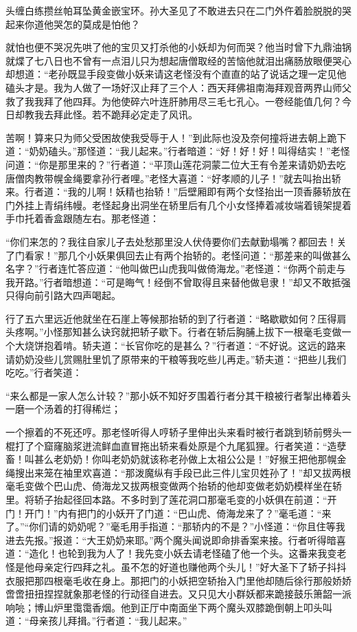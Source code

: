 \documentclass[12pt,UTF8]{ctexbook}
\begin{document}
头缠白练攒丝帕耳坠黄金嵌宝环。孙大圣见了不敢进去只在二门外仵着脸脱脱的哭起来你道他哭怎的莫成是怕他？

就怕也便不哭况先哄了他的宝贝又打杀他的小妖却为何而哭？他当时曾下九鼎油锅就煠了七八日也不曾有一点泪儿只为想起唐僧取经的苦恼他就泪出痛肠放眼便哭心却想道：“老孙既显手段变做小妖来请这老怪没有个直直的站了说话之理一定见他磕头才是。我为人做了一场好汉止拜了三个人：西天拜佛祖南海拜观音两界山师父救了我我拜了他四拜。为他使碎六叶连肝肺用尽三毛七孔心。一卷经能值几何？今日却教我去拜此怪。若不跪拜必定走了风讯。

苦啊！算来只为师父受困故使我受辱于人！”到此际也没及奈何撞将进去朝上跪下道：“奶奶磕头。”那怪道：“我儿起来。”行者暗道：“好！好！好！叫得结实！”老怪问道：“你是那里来的？”行者道：“平顶山莲花洞蒙二位大王有令差来请奶奶去吃唐僧肉教带幌金绳要拿孙行者哩。”老怪大喜道：“好孝顺的儿子！”就去叫抬出轿来。行者道：“我的儿啊！妖精也抬轿！”后壁厢即有两个女怪抬出一顶香藤轿放在门外挂上青绢纬幔。老怪起身出洞坐在轿里后有几个小女怪捧着减妆端着镜架提着手巾托着香盒跟随左右。那老怪道：

“你们来怎的？我往自家儿子去处愁那里没人伏侍要你们去献勤塌嘴？都回去！关了门看家！”那几个小妖果俱回去止有两个抬轿的。老怪问道：“那差来的叫做甚么名字？”行者连忙答应道：“他叫做巴山虎我叫做倚海龙。”老怪道：“你两个前走与我开路。”行者暗想道：“可是晦气！经倒不曾取得且来替他做皂隶！”却又不敢抵强只得向前引路大四声喝起。

行了五六里远近他就坐在石崖上等候那抬轿的到了行者道：“略歇歇如何？压得肩头疼啊。”小怪那知甚么诀窍就把轿子歇下。行者在轿后胸脯上拔下一根毫毛变做一个大烧饼抱着啃。轿夫道：“长官你吃的是甚么？”行者道：“不好说。这远的路来请奶奶没些儿赏赐肚里饥了原带来的干粮等我吃些儿再走。”轿夫道：“把些儿我们吃吃。”行者笑道：

“来么都是一家人怎么计较？”那小妖不知好歹围着行者分其干粮被行者掣出棒着头一磨一个汤着的打得稀烂；

一个擦着的不死还哼。那老怪听得人哼轿子里伸出头来看时被行者跳到轿前劈头一棍打了个窟窿脑浆迸流鲜血直冒拖出轿来看处原是个九尾狐狸。行者笑道：“造孽畜！叫甚么老奶奶！你叫老奶奶就该称老孙做上太祖公公是！”好猴王把他那幌金绳搜出来笼在袖里欢喜道：“那泼魔纵有手段已此三件儿宝贝姓孙了！”却又拔两根毫毛变做个巴山虎、倚海龙又拔两根变做两个抬轿的他却变做老奶奶模样坐在轿里。将轿子抬起径回本路。不多时到了莲花洞口那毫毛变的小妖俱在前道：“开门！开门！”内有把门的小妖开了门道：“巴山虎、倚海龙来了？”毫毛道：“来了。”“你们请的奶奶呢？”毫毛用手指道：“那轿内的不是？”小怪道：“你且住等我进去先报。”报道：“大王奶奶来耶。”两个魔头闻说即命排香案来接。行者听得暗喜道：“造化！也轮到我为人了！我先变小妖去请老怪磕了他一个头。这番来我变老怪是他母亲定行四拜之礼。虽不怎的好道也赚他两个头儿！”好大圣下了轿子抖抖衣服把那四根毫毛收在身上。那把门的小妖把空轿抬入门里他却随后徐行那般娇娇啻啻扭扭捏捏就象那老怪的行动径自进去。又只见大小群妖都来跪接鼓乐箫韶一派响喨；博山炉里霭霭香烟。他到正厅中南面坐下两个魔头双膝跪倒朝上叩头叫道：“母亲孩儿拜揖。”行者道：“我儿起来。”
\end{document}
